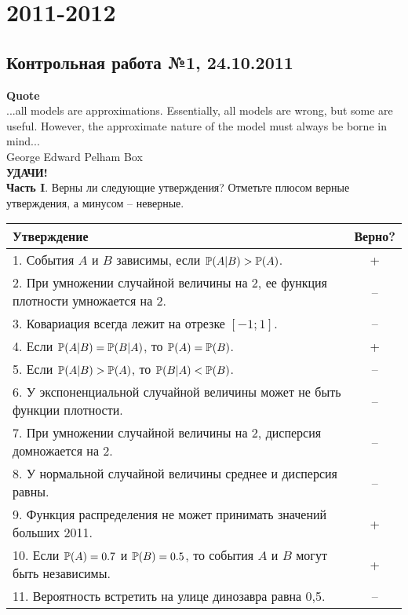 \documentclass[pdftex,12pt,a4paper]{article}
\begin{document}
\section{2011-2012}

\subsection{Контрольная работа №1, 24.10.2011}

\textbf{Quote}\\
...all models are approximations. Essentially, all models are wrong, but some are useful. However, the approximate nature of the model must always be borne in mind...\\
George Edward Pelham Box\\

\textbf{УДАЧИ!} \\ 

\textbf{Часть I}. Верны ли следующие утверждения? Отметьте плюсом верные утверждения, а минусом -- неверные. \\

\renewcommand\arraystretch{2.0}

\begin{tabular}{|p{15cm}|c|}
\hline 
Утверждение & Верно? \\ 
\hline 
1. События $A$ и $B$ зависимы, если $\P(A|B)>\P(A)$.  &  + \\ 
\hline 
2. При умножении случайной величины на 2, ее функция плотности умножается на 2. & -- \\ 
\hline 
3. Ковариация всегда лежит на отрезке $[-1;1]$. &  -- \\ 
\hline 
4. Если $\P(A|B)=\P(B|A)$, то $\P(A)=\P(B)$. & + \\ 
\hline 
5. Если $\P(A|B)>\P(A)$, то $\P(B|A)<\P(B)$. & -- \\ 
\hline 
6. У экспоненциальной случайной величины может не быть функции плотности. &  -- \\ 
\hline 
7. При умножении случайной величины на 2, дисперсия домножается на 2. & -- \\
\hline 
8. У нормальной случайной величины среднее и дисперсия равны. &  -- \\ 
\hline 
9. Функция распределения не может принимать значений больших 2011. & + \\ 
\hline 
10. Если $\P(A)=0.7$ и $\P(B)=0.5$, то события $A$ и $B$ могут быть независимы. & + \\ 
\hline 
11. Вероятность встретить на улице динозавра равна 0{,}5. & -- \\ 
\hline 
\end{tabular} 
\end{document}

